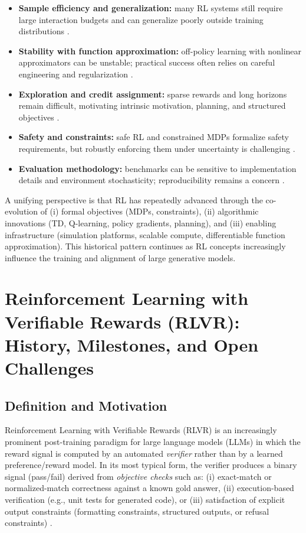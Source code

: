 \documentclass[unnumsec,webpdf,contemporary,large]{oup-authoring-template}
\theoremstyle{thmstyleone}
\theoremstyle{thmstyletwo}
\theoremstyle{thmstylethree}
\begin{document}
\begin{itemize}
  \item \textbf{Sample efficiency and generalization:} many RL systems still require large interaction budgets and can generalize poorly outside training distributions \cite{sutton2018book}.
  \item \textbf{Stability with function approximation:} off-policy learning with nonlinear approximators can be unstable; practical success often relies on careful engineering and regularization \cite{mnih2015dqn}.
  \item \textbf{Exploration and credit assignment:} sparse rewards and long horizons remain difficult, motivating intrinsic motivation, planning, and structured objectives \cite{sutton1990dyna}.
  \item \textbf{Safety and constraints:} safe RL and constrained MDPs formalize safety requirements, but robustly enforcing them under uncertainty is challenging \cite{altman1999cmdp,garcia2015safe}.
  \item \textbf{Evaluation methodology:} benchmarks can be sensitive to implementation details and environment stochasticity; reproducibility remains a concern \cite{henderson2018deep}.
\end{itemize}

A unifying perspective is that RL has repeatedly advanced through the co-evolution of (i) formal objectives (MDPs, constraints), (ii) algorithmic innovations (TD, Q-learning, policy gradients, planning), and (iii) enabling infrastructure (simulation platforms, scalable compute, differentiable function approximation).
This historical pattern continues as RL concepts increasingly influence the training and alignment of large generative models.



\section{Reinforcement Learning with Verifiable Rewards (RLVR): History, Milestones, and Open Challenges}
\label{sec:rlvr_history}

\subsection{Definition and Motivation}
Reinforcement Learning with Verifiable Rewards (RLVR) is an increasingly prominent post-training paradigm for large language models (LLMs) in which the reward signal is computed by an automated \emph{verifier} rather than by a learned preference/reward model. In its most typical form, the verifier produces a binary signal (pass/fail) derived from \emph{objective checks} such as: (i) exact-match or normalized-match correctness against a known gold answer, (ii) execution-based verification (e.g., unit tests for generated code), or (iii) satisfaction of explicit output constraints (formatting constraints, structured outputs, or refusal constraints) \cite{lambert2024tulu3,mroueh2025grpo}.
\end{document}
